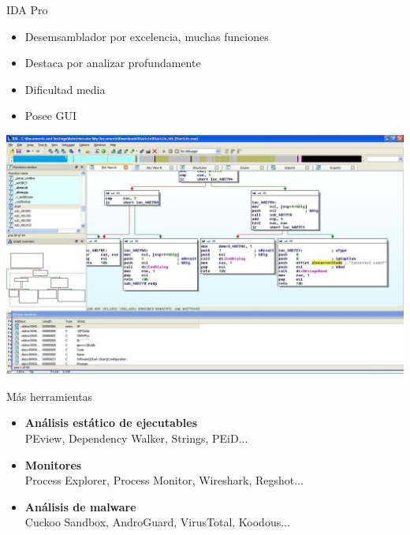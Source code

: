 \documentclass{beamer}
\begin{document}
\begin{frame}{IDA Pro}

\begin{itemize}
	\item Desemsamblador por excelencia, muchas funciones
	\item Destaca por analizar profundamente
	\item Dificultad media
	\item Posee GUI
\end{itemize}
\begin{center}
\includegraphics[scale=0.2]{incorrect_code.jpg}
\end{center}
\end{frame}

\begin{frame}{Más herramientas}
\begin{itemize}
\item \textbf{Análisis estático de ejecutables} \\ \hspace{4ex}PEview, Dependency Walker, Strings, PEiD...
\vspace{3ex}
\item \textbf{Monitores} \\ \hspace{4ex}Process Explorer, Process Monitor, Wireshark, Regshot...
\vspace{3ex}
\item \textbf{Análisis de malware} \\ \hspace{4ex}Cuckoo Sandbox, AndroGuard, VirusTotal, Koodous...


\end{itemize}

\end{frame}
\end{document}
